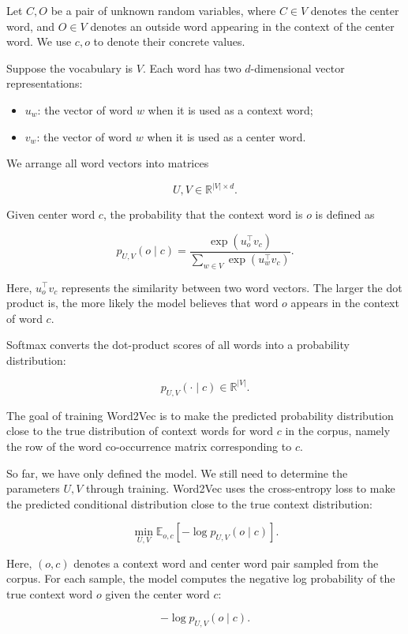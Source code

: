 \documentclass[
  a4paper,
  10pt]{article}
\providecommand{\tightlist}{%
  \setlength{\itemsep}{0pt}\setlength{\parskip}{0pt}}
\begin{document}
Let \(C,O\) be a pair of unknown random variables, where \(C \in V\)
denotes the center word, and \(O \in V\) denotes an outside word
appearing in the context of the center word. We use \(c,o\) to denote
their concrete values.

Suppose the vocabulary is \(V\). Each word has two \(d\)-dimensional
vector representations:

\begin{itemize}
\tightlist
\item
  \(u_w\): the vector of word \(w\) when it is used as a context word;
\item
  \(v_w\): the vector of word \(w\) when it is used as a center word.
\end{itemize}

We arrange all word vectors into matrices

\[
U,V\in\mathbb{R}^{\lvert V\rvert\times d}.
\]

Given center word \(c\), the probability that the context word is \(o\)
is defined as

\[
p_{U,V}(o\mid c)=
\frac{\exp(u_o^\top v_c)}
{\sum_{w\in V}\exp(u_w^\top v_c)}.
\]

Here, \(u_o^\top v_c\) represents the similarity between two word
vectors. The larger the dot product is, the more likely the model
believes that word \(o\) appears in the context of word \(c\).

Softmax converts the dot-product scores of all words into a probability
distribution:

\[
p_{U,V}(\cdot\mid c)\in\mathbb R^{\lvert V\rvert}.
\]

The goal of training Word2Vec is to make the predicted probability
distribution close to the true distribution of context words for word
\(c\) in the corpus, namely the row of the word co-occurrence matrix
corresponding to \(c\).

So far, we have only defined the model. We still need to determine the
parameters \(U,V\) through training. Word2Vec uses the cross-entropy
loss to make the predicted conditional distribution close to the true
context distribution:

\[
\min_{U,V}
\mathbb E_{o,c}
\left[
-\log p_{U,V}(o\mid c)
\right].
\]

Here, \((o,c)\) denotes a context word and center word pair sampled from
the corpus. For each sample, the model computes the negative log
probability of the true context word \(o\) given the center word \(c\):

\[
-\log p_{U,V}(o\mid c).
\]
\end{document}
